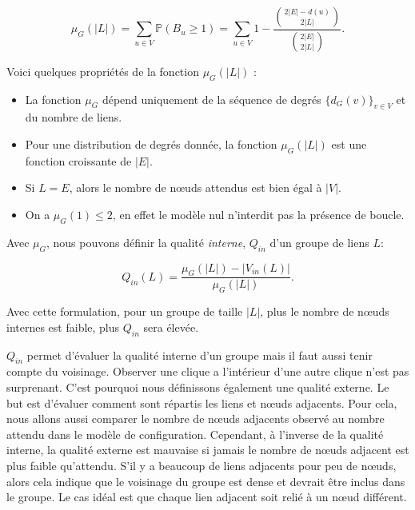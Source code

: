 \begin{equation}
\label{eq:nbsommet_esp} \mu_{G}(|L|) = \sum_{u\in V} \mathbb{P}( B_u \geq 1 )
=  \sum_{u \in V} 1 - \dfrac{ \binom{2|E|-d(u)}{2|L|} }{ \binom{2|E|}{2|L|} }. 
\end{equation}

Voici quelques propriétés de la fonction $\mu_{G}(|L|)$ :
\begin{itemize}
\item La fonction $\mu_{G}$ dépend uniquement de la séquence de degrés $\{d_G(v)\}_{v \in V}$ et du nombre de liens.
\item Pour une distribution de degrés donnée, la fonction $\mu_{G}(|L|)$ est une fonction croissante de $|E|$.
\item Si $L=E$, alors le nombre de n\oe{}uds attendus est bien égal à $|V|$.
\item On a $\mu_{G}(1)\leq 2$, en effet le modèle nul n'interdit pas la présence de boucle.
\end{itemize}

Avec $\mu_G$, nous pouvons définir la qualité \emph{interne}, $Q_{in}$ d'un groupe de liens $L$:
  
\begin{equation}
\label{eq:qin} Q_{in}(L) = \dfrac{\mu_{G}(|L|) - |V_{in}(L)|}{\mu_{G}(|L|)}.
\end{equation}

Avec cette formulation, pour un groupe de taille $|L|$, plus le nombre de n\oe{}uds internes est faible, plus $Q_{in}$ sera élevée.

$Q_{in}$ permet d'évaluer la qualité interne d'un groupe mais il faut aussi tenir compte du voisinage.
Observer une clique a l'intérieur d'une autre clique n'est pas surprenant.
C'est pourquoi nous définissons également une qualité externe.
Le but est d'évaluer comment sont répartis les liens et n\oe{}uds adjacents.
Pour cela, nous allons aussi comparer le nombre de n\oe{}uds adjacents observé au nombre attendu dans le modèle de configuration.
Cependant, à l'inverse de la qualité interne, la qualité externe est mauvaise si jamais le nombre de n\oe{}uds adjacent est plus faible qu'attendu.
S'il y a beaucoup de liens adjacents pour peu de n\oe{}uds, alors cela indique que le voisinage du groupe est dense et devrait être inclus dans le groupe.
Le cas idéal est que chaque lien adjacent soit relié à un n\oe{}ud différent.

